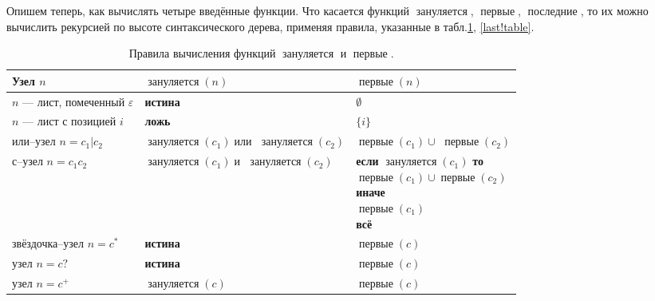 \documentclass[10pt]{report}
\newcommand{\nullable}{\mathop{\textit{зануляется}}}
\newcommand{\firstpos}{\mathop{\textit{первые}}}
\newcommand{\lastpos}{\mathop{\textit{последние}}}
\newcommand{\myor}{\mathop{\textbf{или}}}
\newcommand{\myand}{\mathop{\textbf{и}}}
\begin{document}
Опишем теперь, как вычислять четыре введённые функции. Что касается функций $\nullable$, $\firstpos$, $\lastpos$, то их можно вычислить рекурсией по высоте синтаксического дерева, применяя
правила, указанные в табл.\ref{null.first!table}, \ref{last!table}.%
\begin{table}[!h]
  \centering
  \caption{Правила вычисления функций $\nullable$ и $\firstpos$.}\label{null.first!table}
\begin{tabular}{|l|p{38mm}|l|}  \hline
Узел $n$                                & $\nullable(n)$                           & $\firstpos(n)$                          \\  \hline
$n$ --- лист, помеченный $\varepsilon$  & \textbf{истина}                          & $\emptyset$                             \\  \hline
$n$ --- лист с позицией $i$             & \textbf{ложь}                            & $\{i\}$                                 \\  \hline
или--узел $n=c_1|c_2$                   & $\nullable(c_1)\myor$ $\nullable(c_2)$   & $\firstpos(c_1)\cup$ $\firstpos(c_2)$   \\  \hline
с--узел $n=c_1c_2$                      & $\nullable(c_1)\myand$ $\nullable(c_2)$  &
{\parbox[t]{50mm}{%
\textbf{если} $\nullable(c_1)$ \textbf{то}\\
\phantom{есл}$\firstpos(c_1)\cup\firstpos(c_2)$\\
\textbf{иначе}\\
\phantom{есл}$\firstpos(c_1)$\\
\textbf{всё}%
}}
\\  \hline
звёздочка--узел $n=c^*$                 & \textbf{истина}                          & $\firstpos(c)$                          \\  \hline
узел $n=c?$                             & \textbf{истина}                          & $\firstpos(c)$                          \\  \hline
узел $n=c^+$                            & $\nullable(c)$                           & $\firstpos(c)$                          \\  \hline
\end{tabular}
\end{table}
\end{document}
